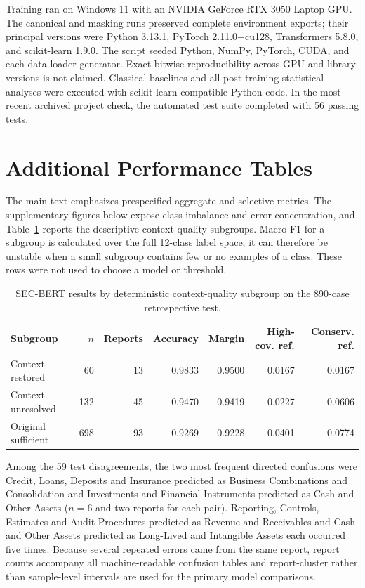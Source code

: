 \documentclass[11pt]{article}
\begin{document}
Training ran on Windows 11 with an NVIDIA GeForce RTX 3050 Laptop GPU. The
canonical and masking runs preserved complete environment exports; their principal
versions were Python 3.13.1, PyTorch 2.11.0+cu128, Transformers 5.8.0, and
scikit-learn 1.9.0. The script seeded
Python, NumPy, PyTorch, CUDA, and each data-loader generator. Exact bitwise
reproducibility across GPU and library versions is not claimed. Classical
baselines and all post-training statistical analyses were executed with
scikit-learn-compatible Python code. In the most recent archived project check,
the automated test suite completed with 56 passing tests.

\section{Additional Performance Tables}
\label{app:additional-results}

The main text emphasizes prespecified aggregate and selective metrics. The
supplementary figures below expose class imbalance and error concentration, and
Table~\ref{tab:context-subgroups} reports the descriptive context-quality
subgroups. Macro-F1 for a subgroup is calculated over the full 12-class label
space; it can therefore be unstable when a small subgroup contains few or no
examples of a class. These rows were not used to choose a model or threshold.

\begin{table}[ht]
  \centering
  \small
  \caption{SEC-BERT results by deterministic context-quality subgroup on the
  890-case retrospective test.}
  \label{tab:context-subgroups}
  \begin{tabular}{lrrrrrr}
    \toprule
    Subgroup & $n$ & Reports & Accuracy & Margin & High-cov. ref. & Conserv. ref. \\
    \midrule
    Context restored & 60 & 13 & 0.9833 & 0.9500 & 0.0167 & 0.0167 \\
    Context unresolved & 132 & 45 & 0.9470 & 0.9419 & 0.0227 & 0.0606 \\
    Original sufficient & 698 & 93 & 0.9269 & 0.9228 & 0.0401 & 0.0774 \\
    \bottomrule
  \end{tabular}
\end{table}

Among the 59 test disagreements, the two most frequent directed confusions were
Credit, Loans, Deposits and Insurance predicted as Business Combinations and
Consolidation and Investments and Financial Instruments predicted as Cash and
Other Assets ($n=6$ and two reports for each pair). Reporting, Controls,
Estimates and Audit Procedures predicted as Revenue and Receivables and Cash and
Other Assets predicted as Long-Lived and Intangible Assets each occurred five
times. Because several repeated errors came
from the same report, report counts accompany all machine-readable confusion
tables and report-cluster rather than sample-level intervals are used for the
primary model comparisons.
\end{document}
